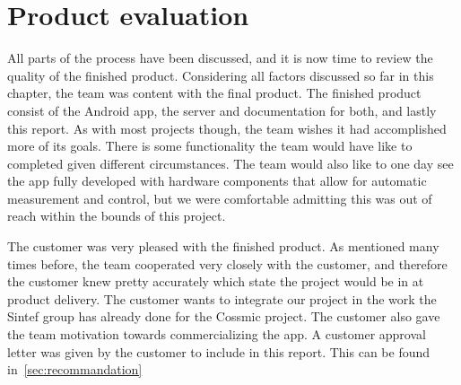 \section{Product evaluation}
All parts of the process have been discussed, and it is now time to review the quality of the finished product. Considering all factors discussed so far in this chapter, the team was content with the final product. The finished product consist of the Android app, the server and documentation for both, and lastly this report. As with most projects though, the team wishes it had accomplished more of its goals. There is some functionality the team would have like to completed given different circumstances. The team would also like to one day see the app  fully developed with hardware components that allow for automatic measurement and control, but we were comfortable admitting this was out of reach within the bounds of this project. 

The customer was very pleased with the finished product. As mentioned many times before, the team cooperated very closely with the customer, and therefore the customer knew pretty accurately which state the project would be in at product delivery. The customer wants to integrate our project in the work the Sintef group has already done for the Cossmic project. The customer also gave the team motivation towards commercializing the app. A customer approval letter was given by the customer to include in this report. This can be found in~\ref{sec:recommandation}